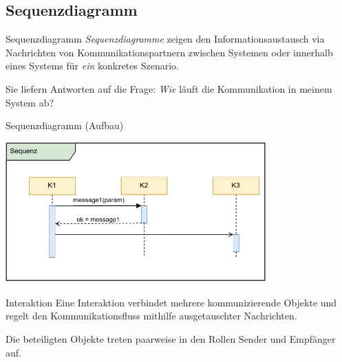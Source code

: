 \subsection{Sequenzdiagramm}

\begin{defi}{Sequenzdiagramm}
    \emph{Sequenzdiagramme} zeigen den Informationsaustausch via Nachrichten von Kommunikationspartnern zwischen Systemen oder innerhalb eines Systems für \emph{ein} konkretes Szenario.

    Sie liefern Antworten auf die Frage:
    \emph{Wie} läuft die Kommunikation in meinem System ab?
\end{defi}

\begin{defi}{Sequenzdiagramm (Aufbau)}
    \begin{center}
        \includegraphics[width=0.75\textwidth]{includes/figures/defi_diagrams_sequenz_intro.pdf}
    \end{center}
\end{defi}

\begin{defi}{Interaktion}
    Eine Interaktion verbindet mehrere kommunizierende Objekte und regelt den Kommunikationsfluss mithilfe ausgetauschter Nachrichten.

    Die beteiligten Objekte treten paarweise in den Rollen Sender und Empfänger auf.
\end{defi}

